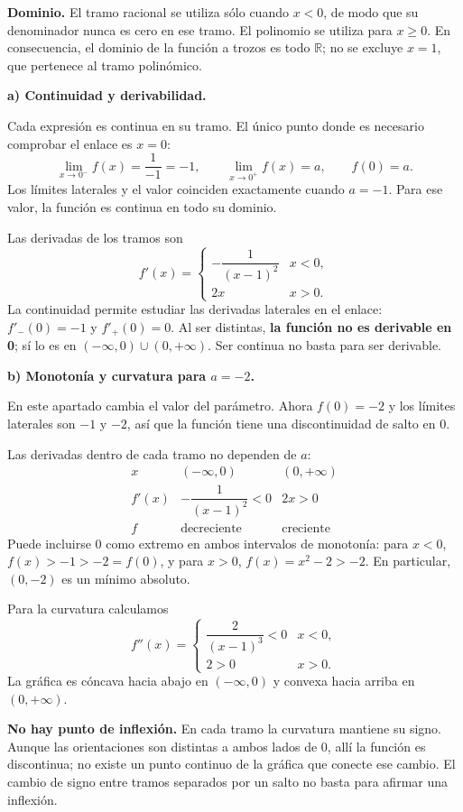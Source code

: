 \textbf{Dominio.} El tramo racional se utiliza sólo cuando $x<0$, de modo que su denominador nunca es cero en ese tramo. El polinomio se utiliza para $x\geq0$. En consecuencia, el dominio de la función a trozos es todo $\mathbb R$; no se excluye $x=1$, que pertenece al tramo polinómico.

\textbf{a) Continuidad y derivabilidad.}\par\nopagebreak[4]

Cada expresión es continua en su tramo. El único punto donde es necesario comprobar el enlace es $x=0$:
\[
\lim_{x\to0^-}f(x)=\frac1{-1}=-1,\qquad
\lim_{x\to0^+}f(x)=a,\qquad f(0)=a.
\]
Los límites laterales y el valor coinciden exactamente cuando $\boxed{a=-1}$. Para ese valor, la función es continua en todo su dominio.

Las derivadas de los tramos son
\[
f'(x)=\begin{cases}-\dfrac1{(x-1)^2}&x<0,\\2x&x>0.\end{cases}
\]
La continuidad permite estudiar las derivadas laterales en el enlace: $f'_-(0)=-1$ y $f'_+(0)=0$. Al ser distintas, \textbf{la función no es derivable en 0}; sí lo es en $(-\infty,0)\cup(0,+\infty)$. Ser continua no basta para ser derivable.

\textbf{b) Monotonía y curvatura para $a=-2$.}\par\nopagebreak[4]

En este apartado cambia el valor del parámetro. Ahora $f(0)=-2$ y los límites laterales son $-1$ y $-2$, así que la función tiene una discontinuidad de salto en 0.

Las derivadas dentro de cada tramo no dependen de $a$:
\[
\begin{array}{c|cc}
x&(-\infty,0)&(0,+\infty)\\\hline
f'(x)&-\dfrac1{(x-1)^2}<0&2x>0\\
f&\text{decreciente}&\text{creciente}
\end{array}
\]
Puede incluirse 0 como extremo en ambos intervalos de monotonía: para $x<0$, $f(x)>-1>-2=f(0)$, y para $x>0$, $f(x)=x^2-2>-2$. En particular, $(0,-2)$ es un mínimo absoluto.

Para la curvatura calculamos
\[
f''(x)=\begin{cases}\dfrac2{(x-1)^3}<0&x<0,\\2>0&x>0.\end{cases}
\]
La gráfica es cóncava hacia abajo en $(-\infty,0)$ y convexa hacia arriba en $(0,+\infty)$.

\textbf{No hay punto de inflexión.} En cada tramo la curvatura mantiene su signo. Aunque las orientaciones son distintas a ambos lados de 0, allí la función es discontinua; no existe un punto continuo de la gráfica que conecte ese cambio. El cambio de signo entre tramos separados por un salto no basta para afirmar una inflexión.
